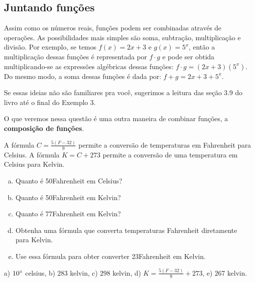 \documentclass[main.tex]{subfiles}
\begin{document}
\subsection*{Juntando funções}

Assim como os números reais, funções podem ser combinadas através de operações. As possibilidades mais simples são soma, subtração, multiplicação e divisão. Por exemplo, se temos $f(x)=2x+3$ e $g(x)=5^x$, então a multiplicação dessas funções é representada por $f \cdot g$ e pode ser obtida multiplicando-se as expressões algébricas dessas funções: $f \cdot g = (2x+3)(5^x)$. Do mesmo modo, a soma dessas funções é dada por: $f+g = 2x+3+5^x$.

Se essas ideias não são familiares pra você, sugerimos a leitura das seção 3.9 do livro  até o final do Exemplo 3.

O que veremos nessa questão é uma outra maneira de combinar funções, a \textbf{composição de funções}.

\begin{questao}
A fórmula $C=\frac{5(F-32)}{9}$ permite a conversão de temperaturas em Fahrenheit para Celsius. A fórmula $K=C+273$ permite a conversão de uma temperatura em Celsius para Kelvin.
\begin{enumerate}[a)]
\item Quanto é 50\degree Fahrenheit em Celsius?
\item Quanto é 50\degree Fahrenheit em Kelvin?
\item Quanto é 77\degree Fahrenheit em Kelvin?
\item Obtenha uma fórmula que converta temperaturas Fahrenheit diretamente para Kelvin.
\item Use essa fórmula para obter converter 23\degree Fahrenheit em Kelvin.
\end{enumerate}
\end{questao}


\begin{gabarito}
	\begin{gabaritoQuestao}
		a) $10\degree$ celsius, b) $283$ kelvin, c) $298$ kelvin, d) $K=\frac{5(F-32)}{9}+273$, e) $267$ kelvin.
	\end{gabaritoQuestao}
\end{gabarito}
\end{document}
